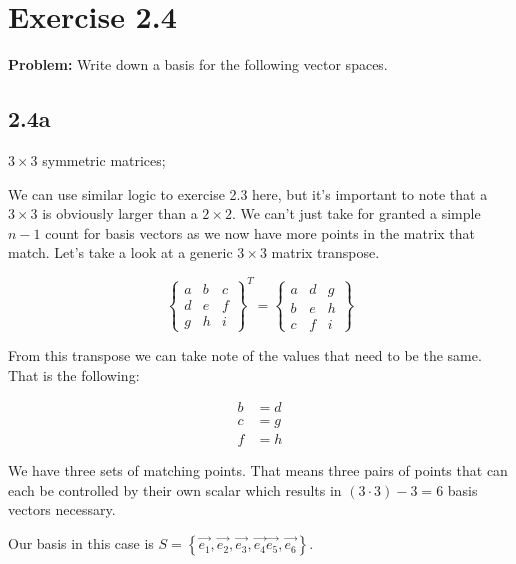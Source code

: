 \section*{Exercise 2.4}

\textbf{Problem:} Write down a basis for the following vector spaces.

\subsection*{2.4a} $3 \times 3$ symmetric matrices;

We can use similar logic to exercise 2.3 here, but it's important to note that a $3 \times 3$ is obviously larger than a $2 \times 2$. We can't just take for granted a simple $n - 1$ count for basis vectors as we now have more points in the matrix that match. Let's take a look at a generic $3 \times 3$ matrix transpose.

\[
	\begin{Bmatrix}
		a & b & c \\
		d & e & f \\
		g & h & i
	\end{Bmatrix}^T
=
	\begin{Bmatrix}
		a & d & g \\
		b & e & h \\
		c & f & i
	\end{Bmatrix}
\]

From this transpose we can take note of the values that need to be the same. That is the following:

\[
	\begin{aligned}
		b &= d \\
		c &= g \\
		f &= h
	\end{aligned}
\]

We have three sets of matching points. That means three pairs of points that can each be controlled by their own scalar which results in $(3 \cdot 3) - 3 = 6$ basis vectors necessary.

Our basis in this case is $S = \left\{ \vec{e_{1}}, \vec{e_{2}}, \vec{e_{3}}, \vec{e_{4}} \vec{e_{5}}, \vec{e_{6}}\right\}$.

